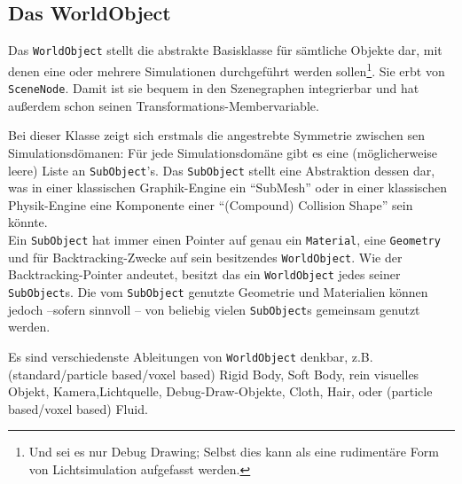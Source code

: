 	


\subsection{Das WorldObject}
	\label{sec:worldObject}
	Das \lstinline|WorldObject| stellt die abstrakte Basisklasse für sämtliche Objekte dar, mit denen eine oder mehrere 
	Simulationen durchgeführt werden sollen\footnote{Und sei es nur Debug Drawing; Selbst dies kann als eine 
	rudimentäre Form von Lichtsimulation aufgefasst werden.}. Sie erbt von \lstinline|SceneNode|. Damit ist sie bequem 
	in den Szenegraphen integrierbar und hat außerdem schon seinen Transformations-Membervariable.
	
	Bei dieser Klasse zeigt sich erstmals die angestrebte Symmetrie zwischen sen Simulationsdömanen: 
	Für jede Simulationsdomäne
	gibt es eine (möglicherweise leere) Liste an \lstinline|SubObject|'s. Das \lstinline|SubObject| 
	stellt eine Abstraktion dessen dar, was in einer klassischen Graphik-Engine ein "`SubMesh"' oder
	in einer klassischen Physik-Engine eine Komponente einer "`(Compound) Collision Shape"' sein könnte.\\
	Ein \lstinline|SubObject| hat immer einen Pointer auf genau ein \lstinline|Material|, 
	eine \lstinline|Geometry|  und für Backtracking-Zwecke auf sein besitzendes	\lstinline|WorldObject|.
	Wie der Backtracking-Pointer andeutet, besitzt das ein \lstinline|WorldObject| jedes seiner \lstinline|SubObject|s.
	Die vom \lstinline|SubObject| genutzte Geometrie und Materialien können jedoch --sofern sinnvoll -- von beliebig
	vielen \lstinline|SubObject|s gemeinsam genutzt werden.
	
	Es sind verschiedenste Ableitungen von \lstinline|WorldObject| denkbar, z.B. 
	(standard/particle based/voxel based) Rigid Body, Soft Body, rein visuelles Objekt,  
	Kamera,Lichtquelle, Debug-Draw-Objekte, Cloth, Hair, oder (particle based/voxel based) Fluid.
	
